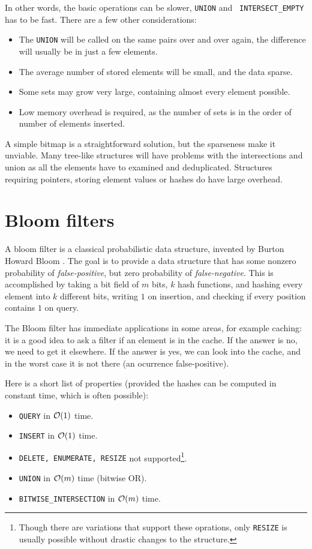 In other words, the basic operations can be slower, {\tt UNION} and {\tt
INTERSECT\_EMPTY} has to be fast. There are a few other considerations:

\begin{itemize}
	\item The {\tt UNION} will be called on the same pairs over and over again,
		the difference will usually be in just a few elements.
	\item The average number of stored elements will be small, and the data sparse.
	\item Some sets may grow very large, containing almost every element possible.
	\item Low memory overhead is required, as the number of sets is in the order
		of number of elements inserted.
\end{itemize}

A simple bitmap is a straightforward solution, but the sparseness make it
unviable. Many tree-like structures will have problems with the intersections
and union as all the elements have to examined and deduplicated. Structures
requiring pointers, storing element values or hashes do have large overhead.

\section{Bloom filters}

A bloom filter is a classical probabilistic data structure, invented by Burton
Howard Bloom \cite{Bloom1970}. The goal is to provide a data structure
that has some nonzero probability of {\it false-positive}, but zero probability
of {\it false-negative}. This is accomplished by taking a bit field of $m$ bits,
$k$ hash functions, and hashing every element into $k$ different bits, writing
$1$ on insertion, and checking if every position contains $1$ on query.

The Bloom filter has immediate applications in some areas, for example caching:
it is a good idea to ask a filter if an element is in the cache. If the answer is
no, we need to get it elsewhere. If the answer is yes, we can look into the
cache, and in the worst case it is not there (an ocurrence false-positive).

Here is a short list of properties (provided the hashes can be computed in
constant time, which is often possible):

\begin{itemize}
	\item {\tt QUERY} in $\mathcal{O}(1)$ time.
	\item {\tt INSERT} in $\mathcal{O}(1)$ time.
	\item {\tt DELETE, ENUMERATE, RESIZE} not supported\footnote{Though there
		are variations that support these oprations, only {\tt RESIZE} is usually
		possible without drastic changes to the structure.}.
	\item {\tt UNION} in $\mathcal{O}(m)$ time (bitwise OR).
	\item {\tt BITWISE\_INTERSECTION} in $\mathcal{O}(m)$ time.
\end{itemize}

